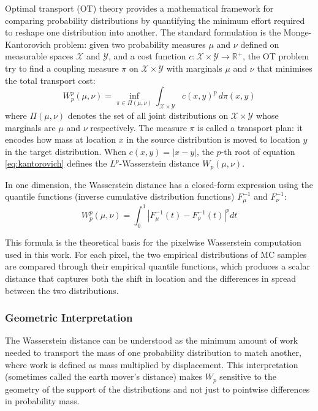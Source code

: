 \documentclass[12pt]{article}
\begin{document}
Optimal transport (OT) theory provides a mathematical framework for comparing
probability distributions by quantifying the minimum effort required to reshape one
distribution into another. The standard formulation is the Monge-Kantorovich problem:
given two probability measures $\mu$ and $\nu$ defined on measurable spaces $\mathcal{X}$
and $\mathcal{Y}$, and a cost function $c : \mathcal{X} \times \mathcal{Y} \to \mathbb{R}^+$,
the OT problem try to find a coupling measure $\pi$ on $\mathcal{X} \times \mathcal{Y}$ with
marginals $\mu$ and $\nu$ that minimises the total transport cost:
\begin{equation}
    W_p^p(\mu, \nu) = \inf_{\pi \in \Pi(\mu,\nu)}
    \int_{\mathcal{X} \times \mathcal{Y}} c(x,y)^p \, d\pi(x,y)
    \label{eq:kantorovich}
\end{equation}
where $\Pi(\mu, \nu)$ denotes the set of all joint distributions on
$\mathcal{X} \times \mathcal{Y}$ whose marginals are $\mu$ and $\nu$ respectively.
The measure $\pi$ is called a transport plan: it encodes how mass at location $x$
in the source distribution is moved to location $y$ in the target distribution.
When $c(x,y) = |x - y|$, the $p$-th root of equation \eqref{eq:kantorovich} defines
the $L^p$-Wasserstein distance $W_p(\mu, \nu)$.

In one dimension, the Wasserstein distance has a closed-form expression using the
quantile functions (inverse cumulative distribution functions) $F_\mu^{-1}$ and
$F_\nu^{-1}$:
\begin{equation}
    W_p^p(\mu, \nu) = \int_0^1 \left| F_\mu^{-1}(t) - F_\nu^{-1}(t) \right|^p dt
    \label{eq:wasserstein_1d}
\end{equation}

This formula is the theoretical basis for the pixelwise Wasserstein computation used
in this work. For each pixel, the two empirical distributions of MC samples are
compared through their empirical quantile functions, which produces a scalar distance
that captures both the shift in location and the differences in spread between the
two distributions.

\subsubsection{Geometric Interpretation}

The Wasserstein distance can be understood as the minimum amount of work needed to
transport the mass of one probability distribution to match another, where work is
defined as mass multiplied by displacement. This interpretation (sometimes called the
earth mover's distance) makes $W_p$ sensitive to the geometry of
the support of the distributions and not just to pointwise differences in probability
mass.
\end{document}
